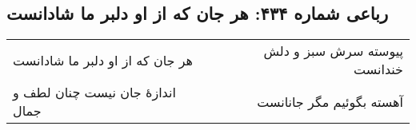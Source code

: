 \begin{center}
\section*{رباعی شماره ۴۳۴: هر جان که از او دلبر ما شادانست}
\label{sec:0434}
\begin{longtable}{l p{0.5cm} r}
هر جان که از او دلبر ما شادانست
&&
پیوسته سرش سبز و دلش خندانست
\\
اندازهٔ جان نیست چنان لطف و جمال
&&
آهسته بگوئیم مگر جانانست
\\
\end{longtable}
\end{center}
